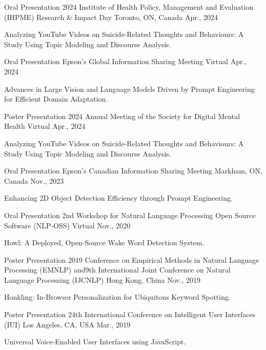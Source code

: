\begin{cventries}
{\begin{cvitems}
\end{cvitems}
}
\cventry
{Oral Presentation} %
{2024 Institute of Health Policy, Management and Evaluation (IHPME) Research \& Impact Day} %
{Toronto, ON, Canada} %
{Apr., 2024} %
{ %
\begin{cvitems}
\item {Analyzing YouTube Videos on Suicide-Related Thoughts and Behaviours: A Study Using Topic Modeling and Discourse Analysis.}
\end{cvitems}
}
\cventry
{Oral Presentation} %
{Epson's Global Information Sharing Meeting} %
{Virtual} %
{Apr., 2024} %
{ %
\begin{cvitems}
\item {Advances in Large Vision and Language Models Driven by Prompt Engineering for Efficient Domain Adaptation.}
\end{cvitems}
}
\cventry
{Poster Presentation} %
{2024 Annual Meeting of the Society for Digital Mental Health} %
{Virtual} %
{Apr., 2024} %
{ %
\begin{cvitems}
\item {Analyzing YouTube Videos on Suicide-Related Thoughts and Behaviours: A Study Using Topic Modeling and Discourse Analysis.}
\end{cvitems}
}
\cventry
{Oral Presentation} %
{Epson's Canadian Information Sharing Meeting} %
{Markham, ON, Canada} %
{Nov., 2023} %
{ %
\begin{cvitems}
\item {Enhancing 2D Object Detection Efficiency through Prompt Engineering.}
\end{cvitems}
}
\cventry
{Oral Presentation} %
{2nd Workshop for Natural Language Processing Open Source Software (NLP-OSS)} %
{Virtual} %
{Nov., 2020} %
{ %
\begin{cvitems}
\item {Howl: A Deployed, Open-Source Wake Word Detection System.}
\end{cvitems}
}
\cventry
{Poster Presentation} %
{2019 Conference on Empirical Methods in Natural Language Processing (EMNLP) and\newline 9th International Joint Conference on Natural Language Processing (IJCNLP)} %
{Hong Kong, China} %
{Nov., 2019} %
{ %
\begin{cvitems}
\item {Honkling: In-Browser Personalization for Ubiquitous Keyword Spotting.}
\end{cvitems}
}
\cventry
{Poster Presentation} %
{24th International Conference on Intelligent User Interfaces (IUI)} %
{Los Angeles, CA, USA} %
{Mar., 2019} %
{ %
\begin{cvitems}
\item {Universal Voice-Enabled User Interfaces using JavaScript.}
\end{cvitems}
}
\end{cventries}

